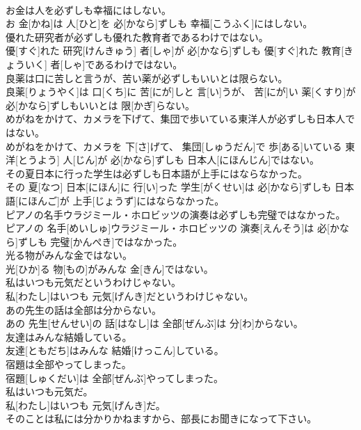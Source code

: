 \documentclass[8pt]{extreport}
\begin{document}
\begin{CJK}{UTF8}{min}
\\	お金は人を必ずしも幸福にはしない。	
\\	お 金[かね]は 人[ひと]を 必[かなら]ずしも 幸福[こうふく]にはしない。
\\	優れた研究者が必ずしも優れた教育者であるわけではない。	
\\	優[すぐ]れた 研究[けんきゅう] 者[しゃ]が 必[かなら]ずしも 優[すぐ]れた 教育[きょういく] 者[しゃ]であるわけではない。
\\	良薬は口に苦しと言うが、苦い薬が必ずしもいいとは限らない。	
\\	良薬[りょうやく]は 口[くち]に 苦[にが]しと 言[い]うが、 苦[にが]い 薬[くすり]が 必[かなら]ずしもいいとは 限[かぎ]らない。
\\	めがねをかけて、カメラを下げて、集団で歩いている東洋人が必ずしも日本人ではない。	
\\	めがねをかけて、カメラを 下[さ]げて、 集団[しゅうだん]で 歩[ある]いている 東洋[とうよう] 人[じん]が 必[かなら]ずしも 日本人[にほんじん]ではない。
\\	その夏日本に行った学生は必ずしも日本語が上手にはならなかった。	
\\	その 夏[なつ] 日本[にほん]に 行[い]った 学生[がくせい]は 必[かなら]ずしも 日本語[にほんご]が 上手[じょうず]にはならなかった。
\\	ピアノの名手ウラジミール・ホロビッツの演奏は必ずしも完璧ではなかった。	
\\	ピアノの 名手[めいしゅ]ウラジミール・ホロビッツの 演奏[えんそう]は 必[かなら]ずしも 完璧[かんぺき]ではなかった。
\\	光る物がみんな金ではない。	
\\	光[ひか]る 物[もの]がみんな 金[きん]ではない。
\\	私はいつも元気だというわけじゃない。	
\\	私[わたし]はいつも 元気[げんき]だというわけじゃない。
\\	あの先生の話は全部は分からない。	
\\	あの 先生[せんせい]の 話[はなし]は 全部[ぜんぶ]は 分[わ]からない。
\\	友達はみんな結婚している。	
\\	友達[ともだち]はみんな 結婚[けっこん]している。
\\	宿題は全部やってしまった。	
\\	宿題[しゅくだい]は 全部[ぜんぶ]やってしまった。
\\	私はいつも元気だ。	
\\	私[わたし]はいつも 元気[げんき]だ。
\\	そのことは私には分かりかねますから、部長にお聞きになって下さい。	

\end{CJK}
\end{document}
